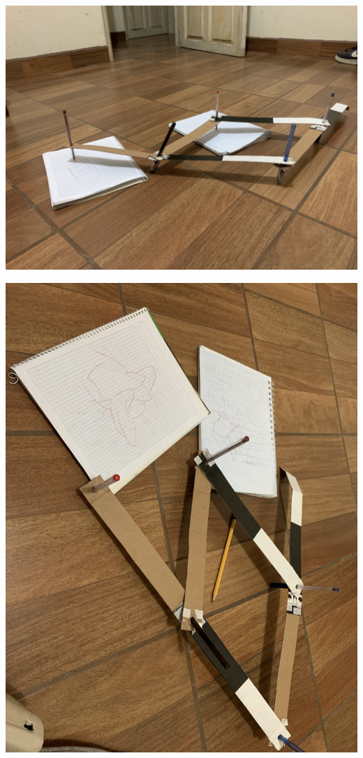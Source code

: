 \begin{center}
	\includegraphics[scale=0.1]{Images/2}
\end{center}
\begin{center}
	\includegraphics[scale=0.1]{Images/3}
\end{center}
